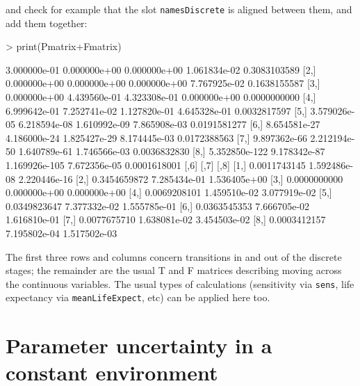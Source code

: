 \documentclass{article}
\begin{document}
and check for example that the slot {\tt namesDiscrete} is aligned between them, and add them together: 
\begin{Schunk}
\begin{Sinput}
> print(Pmatrix+Fmatrix)
\end{Sinput}
\begin{Soutput}
              [,1]         [,2]          [,3]         [,4]         [,5]
[1,]  3.000000e-01 0.000000e+00  0.000000e+00 1.061834e-02 0.3083103589
[2,]  0.000000e+00 0.000000e+00  0.000000e+00 7.767925e-02 0.1638155587
[3,]  0.000000e+00 4.439560e-01  4.323308e-01 0.000000e+00 0.0000000000
[4,]  6.999642e-01 7.252741e-02  1.127820e-01 4.645328e-01 0.0032817597
[5,]  3.579026e-05 6.218594e-08  1.610992e-09 7.865908e-03 0.0191581277
[6,]  8.654581e-27 4.186000e-24  1.825427e-29 8.174445e-03 0.0172388563
[7,]  9.897362e-66 2.212194e-50  1.640789e-61 1.746566e-03 0.0036832830
[8,] 5.352850e-122 9.178342e-87 1.169926e-105 7.672356e-05 0.0001618001
             [,6]         [,7]         [,8]
[1,] 0.0011743145 1.592486e-08 2.220446e-16
[2,] 0.3454659872 7.285434e-01 1.536405e+00
[3,] 0.0000000000 0.000000e+00 0.000000e+00
[4,] 0.0069208101 1.459510e-02 3.077919e-02
[5,] 0.0349823647 7.377332e-02 1.555785e-01
[6,] 0.0363545353 7.666705e-02 1.616810e-01
[7,] 0.0077675710 1.638081e-02 3.454503e-02
[8,] 0.0003412157 7.195802e-04 1.517502e-03
\end{Soutput}
\end{Schunk}
The first three rows and columns concern transitions in and out of the discrete stages; the remainder are the usual T and F matrices describing moving across the continuous variables. The usual types of calculations (sensitivity via {\tt sens}, life expectancy via {\tt meanLifeExpect}, etc) can be applied here too.    


\section{Parameter uncertainty in a constant environment}
\end{document}
